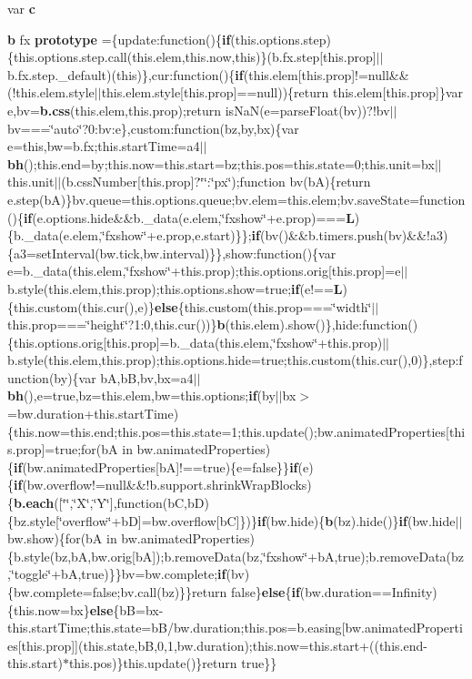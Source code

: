 \begin{DoxyCompactItemize}
\item 
var {\bf c}
\item 
{\bf b} fx {\bf prototype} =\{update\-:function()\{{\bf if}(this.\-options.\-step)\{this.\-options.\-step.\-call(this.\-elem,this.\-now,this)\}(b.\-fx.\-step[this.\-prop]$\vert$$\vert$b.\-fx.\-step.\-\_\-default)(this)\},cur\-:function()\{{\bf if}(this.\-elem[this.\-prop]!=null\&\&(!this.\-elem.\-style$\vert$$\vert$this.\-elem.\-style[this.\-prop]==null))\{return this.\-elem[this.\-prop]\}var e,bv={\bf b.\-css}(this.\-elem,this.\-prop);return is\-Na\-N(e=parse\-Float(bv))?!bv$\vert$$\vert$bv===\char`\"{}auto\char`\"{}?0\-:bv\-:e\},custom\-:function(bz,by,bx)\{var e=this,bw=b.\-fx;this.\-start\-Time=a4$\vert$$\vert${\bf bh}();this.\-end=by;this.\-now=this.\-start=bz;this.\-pos=this.\-state=0;this.\-unit=bx$\vert$$\vert$this.\-unit$\vert$$\vert$(b.\-css\-Number[this.\-prop]?\char`\"{}\char`\"{}\-:\char`\"{}px\char`\"{});function bv(b\-A)\{return e.\-step(b\-A)\}bv.\-queue=this.\-options.\-queue;bv.\-elem=this.\-elem;bv.\-save\-State=function()\{{\bf if}(e.\-options.\-hide\&\&b.\-\_\-data(e.\-elem,\char`\"{}fxshow\char`\"{}+e.\-prop)==={\bf L})\{b.\-\_\-data(e.\-elem,\char`\"{}fxshow\char`\"{}+e.\-prop,e.\-start)\}\};{\bf if}(bv()\&\&b.\-timers.\-push(bv)\&\&!a3)\{a3=set\-Interval(bw.\-tick,bw.\-interval)\}\},show\-:function()\{var e=b.\-\_\-data(this.\-elem,\char`\"{}fxshow\char`\"{}+this.\-prop);this.\-options.\-orig[this.\-prop]=e$\vert$$\vert$b.\-style(this.\-elem,this.\-prop);this.\-options.\-show=true;{\bf if}(e!=={\bf L})\{this.\-custom(this.\-cur(),e)\}{\bf else}\{this.\-custom(this.\-prop===\char`\"{}width\char`\"{}$\vert$$\vert$this.\-prop===\char`\"{}height\char`\"{}?1\-:0,this.\-cur())\}{\bf b}(this.\-elem).show()\},hide\-:function()\{this.\-options.\-orig[this.\-prop]=b.\-\_\-data(this.\-elem,\char`\"{}fxshow\char`\"{}+this.\-prop)$\vert$$\vert$b.\-style(this.\-elem,this.\-prop);this.\-options.\-hide=true;this.\-custom(this.\-cur(),0)\},step\-:function(by)\{var b\-A,b\-B,bv,bx=a4$\vert$$\vert${\bf bh}(),e=true,bz=this.\-elem,bw=this.\-options;{\bf if}(by$\vert$$\vert$bx$>$=bw.\-duration+this.\-start\-Time)\{this.\-now=this.\-end;this.\-pos=this.\-state=1;this.\-update();bw.\-animated\-Properties[this.\-prop]=true;for(b\-A in bw.\-animated\-Properties)\{{\bf if}(bw.\-animated\-Properties[b\-A]!==true)\{e=false\}\}{\bf if}(e)\{{\bf if}(bw.\-overflow!=null\&\&!b.\-support.\-shrink\-Wrap\-Blocks)\{{\bf b.\-each}([\char`\"{}\char`\"{},\char`\"{}X\char`\"{},\char`\"{}Y\char`\"{}],function(b\-C,b\-D)\{bz.\-style[\char`\"{}overflow\char`\"{}+b\-D]=bw.\-overflow[b\-C]\})\}{\bf if}(bw.\-hide)\{{\bf b}(bz).hide()\}{\bf if}(bw.\-hide$\vert$$\vert$bw.\-show)\{for(b\-A in bw.\-animated\-Properties)\{b.\-style(bz,b\-A,bw.\-orig[b\-A]);b.\-remove\-Data(bz,\char`\"{}fxshow\char`\"{}+b\-A,true);b.\-remove\-Data(bz,\char`\"{}toggle\char`\"{}+b\-A,true)\}\}bv=bw.\-complete;{\bf if}(bv)\{bw.\-complete=false;bv.\-call(bz)\}\}return false\}{\bf else}\{{\bf if}(bw.\-duration==Infinity)\{this.\-now=bx\}{\bf else}\{b\-B=bx-\/this.\-start\-Time;this.\-state=b\-B/bw.\-duration;this.\-pos=b.\-easing[bw.\-animated\-Properties[this.\-prop]](this.\-state,b\-B,0,1,bw.\-duration);this.\-now=this.\-start+((this.\-end-\/this.\-start)$\ast$this.\-pos)\}this.\-update()\}return true\}\}

\end{DoxyCompactItemize}
